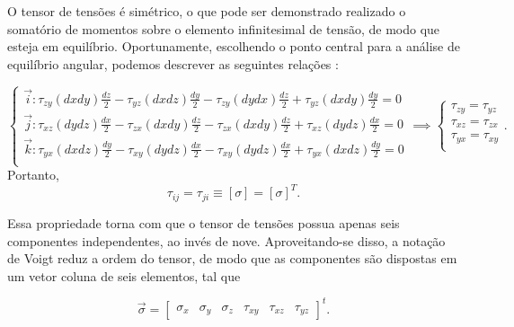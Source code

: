 O tensor de tensões é simétrico, o que pode ser demonstrado realizado o somatório de momentos sobre o elemento infinitesimal de tensão, de modo que esteja em equilíbrio. Oportunamente, escolhendo o ponto central para a análise de equilíbrio angular, podemos descrever as seguintes relações \cite{roy}:

\begin{equation}
    \begin{cases}
        \displaystyle  \vec{i} : \tau_{zy} (dxdy) \frac{dz}{2} - \tau_{yz} (dx dz) \frac{dy}{2} - \tau_{zy} (dydx) \frac{dz}{2}+ \tau_{yz} (dxdy) \frac{dy}{2} = 0 \\

        \displaystyle  \vec{j} : \tau_{xz} (dydz) \frac{dx}{2} - \tau_{zx} (dx dy) \frac{dz}{2} - \tau_{zx} (dx dy) \frac{dz}{2} + \tau_{xz} (dydz) \frac{dx}{2} = 0 \\

        
        \displaystyle  \vec{k} : \tau_{yx} (dxdz) \frac{dy}{2} - \tau_{xy} (dydz) \frac{dx}{2} - \tau_{xy} (dydz) \frac{dx}{2} + \tau_{yx} (dxdz) \frac{dy}{2} = 0 \\

    \end{cases} \implies
    \begin{cases}
        \tau_{zy} = \tau_{yz} \\
        \tau_{xz} = \tau_{zx} \\
        \tau_{yx} = \tau_{xy} \\
    \end{cases}.
\end{equation}
Portanto,
\begin{equation}
    \tau_{ij} = \tau_{ji} \equiv [\sigma] = [\sigma]^T.
\end{equation}

Essa propriedade torna com que o tensor de tensões possua apenas seis componentes independentes, ao invés de nove. Aproveitando-se disso, a notação de Voigt reduz a ordem do tensor, de modo que as componentes são dispostas em um vetor coluna de seis elementos, tal que

\begin{equation}
    \vec{\sigma} = \begin{bmatrix}
        \sigma_x & \sigma_y & \sigma_z & \tau_{xy} & \tau_{xz} & \tau_{yz}
    \end{bmatrix}^t.
\end{equation}



